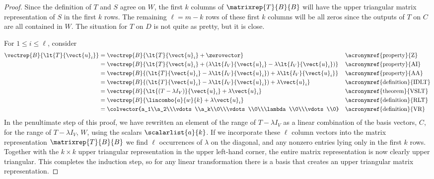 \begin{proof}
%
Since the definition of $T$ and $S$ agree on $W$,  the first $k$ columns of $\matrixrep{T}{B}{B}$ will have the upper triangular matrix representation of $S$ in the first $k$ rows.  The remaining $\ell=m-k$ rows of these first $k$ columns will be all zeros since the outputs of $T$ on $C$ are all contained in $W$.  The situation for $T$ on $D$ is not quite as pretty, but it is close.\par
%
For $1\leq i\leq\ell$, consider
%
\begin{align*}
\vectrep{B}{\lt{T}{\vect{u}_i}}
&=\vectrep{B}{\lt{T}{\vect{u}_i}+\zerovector}&&\text{\acronymref{property}{Z}}\\
%
&=\vectrep{B}{\lt{T}{\vect{u}_i}+\left(\lambda\lt{I_V}{\vect{u}_i}-\lambda\lt{I_V}{\vect{u}_i}\right)}&&\text{\acronymref{property}{AI}}\\
%
&=\vectrep{B}{\left(\lt{T}{\vect{u}_i}-\lambda\lt{I_V}{\vect{u}_i}\right)+\lambda\lt{I_V}{\vect{u}_i}}&&\text{\acronymref{property}{AA}}\\
%
&=\vectrep{B}{\left(\lt{T}{\vect{u}_i}-\lambda\lt{I_V}{\vect{u}_i}\right)+\lambda\vect{u}_i}&&\text{\acronymref{definition}{IDLT}}\\
%
&=\vectrep{B}{\lt{\left(T-\lambda I_V\right)}{\vect{u}_i}+\lambda\vect{u}_i}
&&\text{\acronymref{theorem}{VSLT}}\\
%
&=\vectrep{B}{\lincombo{a}{w}{k}+\lambda\vect{u}_i}
&&\text{\acronymref{definition}{RLT}}\\
%
&=\colvector{a_1\\a_2\\\vdots\\a_k\\0\\\vdots\\0\\\lambda\\0\\\vdots\\0}
&&\text{\acronymref{definition}{VR}}
%
\end{align*}
%
In the penultimate step of this proof, we have rewritten an element of the range of $T-\lambda I_V$ as a linear combination of the basis vectors, $C$, for the range of $T-\lambda I_V$, $W$, using the scalars $\scalarlist{a}{k}$.  If we incorporate these $\ell$ column vectors into the matrix representation $\matrixrep{T}{B}{B}$ we find $\ell$ occurrences of $\lambda$ on the diagonal, and any nonzero entries lying only in the first $k$ rows.  Together with the $k\times k$ upper triangular representation in the upper left-hand corner, the entire matrix representation is now clearly upper triangular.  This completes the induction step, so for any linear transformation there is a basis that creates an upper triangular matrix representation.\par

\end{proof}
